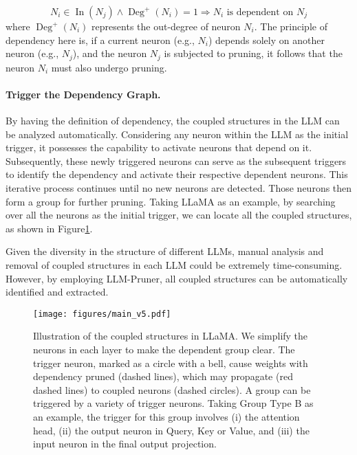 \begin{equation}
     N_i \in \operatorname{In}(N_j) \wedge \operatorname{Deg}^+(N_i) = 1 \Rightarrow N_i \text{ is dependent on } N_j
\end{equation}
where $\operatorname{Deg}^+(N_i)$ represents the out-degree of neuron $N_i$. The principle of dependency here is, if a current neuron (e.g., $N_i$) depends solely on another neuron (e.g., $N_j$), and the neuron $N_j$ is subjected to pruning, it follows that the neuron $N_i$ must also undergo pruning.

\paragraph{Trigger the Dependency Graph.} By having the definition of dependency, the coupled structures in the LLM can be analyzed automatically. Considering any neuron within the LLM as the initial trigger, it possesses the capability to activate neurons that depend on it. Subsequently, these newly triggered neurons can serve as the subsequent triggers to identify the dependency and activate their respective dependent neurons. This iterative process continues until no new neurons are detected. Those neurons then form a group for further pruning. Taking LLaMA as an example, by searching over all the neurons as the initial trigger, we can locate all the coupled structures, as shown in Figure\ref{fig:main}.

Given the diversity in the structure of different LLMs, manual analysis and removal of coupled structures in each LLM could be extremely time-consuming. However, by employing LLM-Pruner, all coupled structures can be automatically identified and extracted.

\begin{figure}[t!]
    \centering
    \texttt{[image: figures/main\_v5.pdf]}
    \caption{
        Illustration of the coupled structures in LLaMA. We simplify the neurons in each layer to make the dependent group clear. The trigger neuron, marked as a circle with a bell, cause weights with dependency pruned (dashed lines), which may propagate (red dashed lines) to coupled neurons (dashed circles). A group can be triggered by a variety of trigger neurons. Taking Group Type B as an example, the trigger for this group involves (i) the attention head, (ii) the output neuron in Query, Key or Value, and (iii) the input neuron in the final output projection.
    }
    \label{fig:main}
\end{figure}

